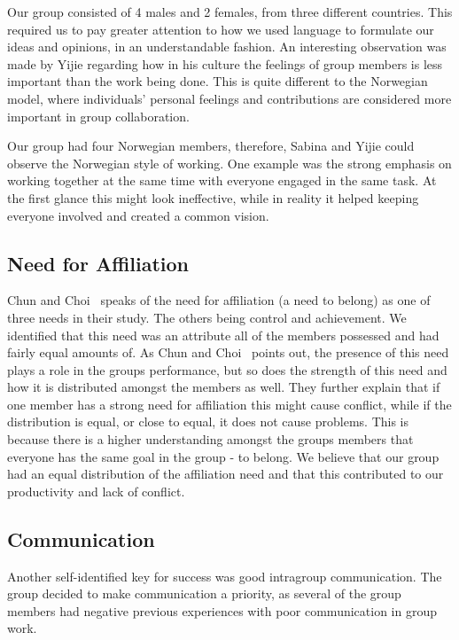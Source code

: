 Our group consisted of 4 males and 2 females, from three different countries. This required us to pay greater attention to how we used language to formulate our ideas and opinions, in an understandable fashion. An interesting observation was made by Yijie regarding how in his culture the feelings of group members is less important than the work being done. This is quite different to the Norwegian model, where individuals’ personal feelings and contributions are considered more important in group collaboration. 

Our group had four Norwegian members, therefore, Sabina and Yijie could observe the Norwegian style of working. One example was the strong emphasis on working together at the same time with everyone engaged in the same task. At the first glance this might look ineffective, while in reality it helped keeping everyone involved and created a common vision. 

\subsection{Need for Affiliation}
Chun and Choi~\cite{2014chin_and_choi} speaks of the need for affiliation (a need to belong) as one of three needs in their study. The others being control and achievement. We identified that this need was an attribute all of the members possessed and had fairly equal amounts of. As Chun and Choi~\cite{2014chin_and_choi} points out, the presence of this need plays a role in the groups performance, but so does the strength of this need and how it is distributed amongst the members as well. They further explain that if one member has a strong need for affiliation this might cause conflict, while if the distribution is equal, or close to equal, it does not cause problems. This is because there is a higher understanding amongst the groups members that everyone has the same goal in the group - to belong. 
We believe that our group had an equal distribution of the affiliation need and that this contributed to our productivity and lack of conflict.

\subsection{Communication}
Another self-identified key for success was good intragroup communication. The group decided to make communication a priority, as several of the group members had negative previous experiences with poor communication in group work. 

